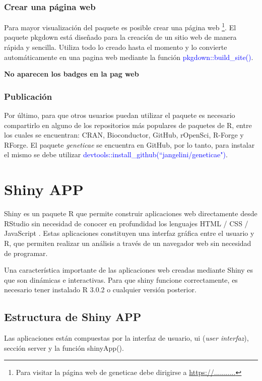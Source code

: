 \subsubsection{Crear una página web}

Para mayor visualización del paquete es posible crear una página web \footnote{Para visitar la página web de geneticae debe dirigirse a \url{https://...........}}. El paquete pkgdown está diseñado para la creación de un sitio web de manera rápida y sencilla. Utiliza todo lo creado hasta el momento y lo convierte automáticamente en una pagina web mediante la función \textcolor{blue}{pkgdown::build\_site()}.

 {\LARGE{\textbf{No aparecen los badges en la pag web}}}


\subsubsection{Publicación}


Por último, para que otros usuarios puedan utilizar el paquete es necesario compartirlo en alguno de los repositorios más populares de paquetes de R, entre los cuales se encuentran: CRAN, Bioconductor, GitHub, rOpenSci, R-Forge y RForge. El paquete \emph{geneticae} se encuentra en GitHub, por lo tanto, para instalar el mismo se debe utilizar \textcolor{blue}{devtools::install\_github(``jangelini/geneticae")}.


\section{Shiny APP}
Shiny es un paquete R que permite construir aplicaciones web directamente desde RStudio sin necesidad de conocer en profundidad los lenguajes HTML / CSS / JavaScript . Estas aplicaciones constituyen una interfaz gráfica entre el usuario y R, que permiten realizar un análisis a través de un navegador web sin necesidad de programar.

Una característica importante de las aplicaciones web creadas mediante Shiny es que son dinámicas e interactivas. Para que shiny funcione correctamente, es necesario tener instalado R 3.0.2 o cualquier versión posterior.

\subsection{Estructura de Shiny APP}

Las aplicaciones están compuestas por la interfaz de usuario, ui (\emph{user interfaz}), sección server y la función shinyApp(). 


